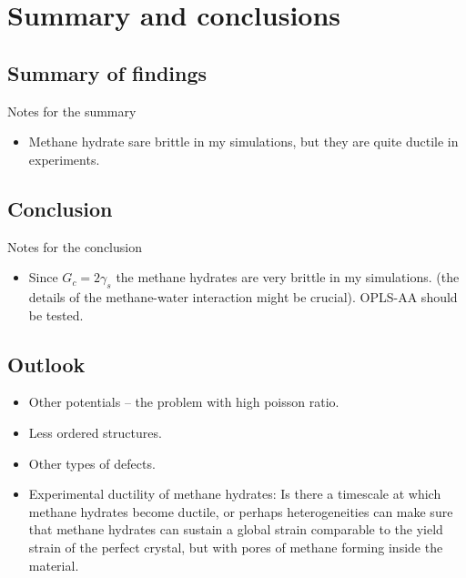 \chapter{Summary and conclusions}

\section{Summary of findings}
Notes for the summary
\begin{itemize}
\item Methane hydrate sare brittle in my simulations, but they are quite ductile in experiments.
\end{itemize}

\section{Conclusion}
Notes for the conclusion
\begin{itemize}
\item Since $G_c = 2\gamma_s$ the methane hydrates are very brittle in my simulations. (the details of the methane-water interaction might be crucial). OPLS-AA should be tested.
\end{itemize}


\section{Outlook}
\begin{itemize}
\item Other potentials – the problem with high poisson ratio.
\item Less ordered structures.
\item Other types of defects.
\item Experimental ductility of methane hydrates: Is there a timescale at which methane hydrates become ductile, or perhaps heterogeneities can make sure that methane hydrates can sustain a global strain comparable to the yield strain of the perfect crystal, but with pores of methane forming inside the material. 
\end{itemize}